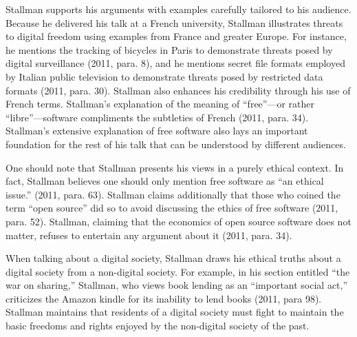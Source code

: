 Stallman supports his arguments with examples carefully tailored to his
audience. Because he delivered his talk at a French university, Stallman
illustrates threats to digital freedom using examples from France and greater
Europe. For instance, he mentions the tracking of bicycles in Paris to
demonstrate threats posed by digital surveillance (2011, para. 8), and he
mentions secret file formats employed by Italian public television to
demonstrate threats posed by restricted data formats (2011, para. 30).
Stallman also enhances his credibility through his use of French terms.
Stallman's explanation of the meaning of “free”—or rather “libre”—software
compliments the subtleties of French (2011, para. 34). Stallman's extensive
explanation of free software also lays an important foundation for the rest of
his talk that can be understood by different audiences.

One should note that Stallman presents his views in a purely ethical context.
In fact, Stallman believes one should only mention free software as “an ethical
issue.” (2011, para. 63). Stallman claims additionally that those who coined
the term “open source” did so to avoid discussing the ethics of free software
(2011, para. 52). Stallman, claiming that the economics of open source software
does not matter, refuses to entertain any argument about it (2011, para. 34).

When talking about a digital society, Stallman draws his ethical truths about a
digital society from a non-digital society. For example, in his section
entitled “the war on sharing,” Stallman, who views book lending as an
“important social act,” criticizes the Amazon kindle for its inability to lend
books (2011, para 98). Stallman maintains that residents of a digital society
must fight to maintain the basic freedoms and rights enjoyed by the non-digital
society of the past.
